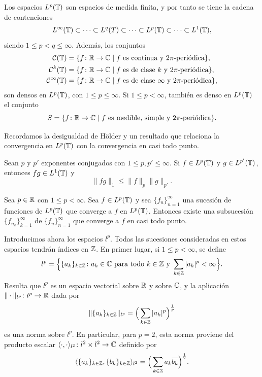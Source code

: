\documentclass[a4paper, 12pt, oneside]{book}
\begin{document}
Los espacios $L^p(\mathbb T)$ son espacios de medida finita, y por tanto se tiene la cadena de contenciones
\[L^\infty(\mathbb T) \subset \cdots \subset L^q(T) \subset \cdots \subset L^p(\mathbb T) \subset \cdots \subset L^1(\mathbb T),\]
siendo $1 \leq p < q \leq \infty$.
Además, los conjuntos
\begin{align*}
    \mathcal{C}(\mathbb T) &= \{f \colon \mathbb R \to \mathbb C \mid f \textup{ es continua y } 2\pi \textup{-periódica}\}, \\
    \mathcal{C}^k(\mathbb T) &= \{f \colon \mathbb R \to \mathbb C \mid f \textup{ es de clase } k \textup{ y } 2\pi \textup{-periódica}\},
    \\
    \mathcal{C}^\infty(\mathbb T) &= \{f \colon \mathbb R \to \mathbb C \mid f \textup{ es de clase } \infty \textup{ y } 2\pi \textup{-periódica}\},
\end{align*}
son densos en $L^p(\mathbb T)$, con $1 \leq p \leq \infty$. Si $1 \leq p < \infty$, también es denso en $L^p(\mathbb T)$ el conjunto
\[S = \{f \colon \mathbb R \to \mathbb C \mid f \textup{ es medible, simple y } 2\pi \textup{-periódica}\}.\]

Recordamos la desigualdad de Hölder y un resultado que relaciona la convergencia en $L^p(\mathbb T)$ con la convergencia en casi todo punto.

\begin{theorem}\label{1.1.1}
    Sean $p$ y $p'$ exponentes conjugados con $1 \leq p,p' \leq \infty$. Si $f \in L^p(\mathbb T)$ y $g \in L^{p'}(\mathbb T)$, entonces $fg \in L^1(\mathbb T)$ y
    \[\|fg\|_1 \leq \|f\|_p\|g\|_{p'}.\]
\end{theorem}

\begin{theorem}\label{1.1.2}
    Sea $p\in\mathbb R$ con $1\leq p < \infty$. Sea $f\in L^p(\mathbb T)$ y sea $\{f_n\}_{n=1}^\infty$ una sucesión de funciones de $L^p(\mathbb T)$ que converge a $f$ en $L^p(\mathbb T)$. Entonces existe una subsucesión $\{f_{n_k}\}_{k=1}^\infty$ de $\{f_n\}_{n=1}^\infty$ que converge a $f$ en casi todo punto.
\end{theorem}

Introducimos ahora los espacios $l^p$. Todas las sucesiones consideradas en estos espacios tendrán índices en $\mathbb Z$. En primer lugar, si $1\leq p<\infty$, se define
\[l^p=\Bigl\{\{a_k\}_{k\in \mathbb Z} \colon a_k \in \mathbb C \textup{ para todo } k \in \mathbb Z \textup{ y } \sum_{k\in\mathbb Z}|a_k|^p < \infty\Bigr\}.\]
Resulta que $l^p$ es un espacio vectorial sobre $\mathbb R$ y sobre $\mathbb C$, y la aplicación $\|\cdot\|_{l^p} \colon l^p \to \mathbb R$ dada por
\[\|\{a_k\}_{k\in\mathbb Z}\|_{l^p} = \Bigl(\,\sum_{k\in\mathbb Z}|a_k|^p\Bigr)^{\frac{1}{p}}\]
es una norma sobre $l^p$. En particular, para $p = 2$, esta norma proviene del producto escalar $\langle \cdot, \cdot \rangle_{l^2} \colon l^2 \times l^2 \to \mathbb C$ definido por
\[\langle \{a_k\}_{k\in\mathbb Z}, \{b_k\}_{k\in\mathbb Z} \rangle_{l^2} = \Bigl(\,\sum_{k\in\mathbb Z}a_k\overline{b_k}\Bigr)^{\frac{1}{2}}.\] 
\end{document}

